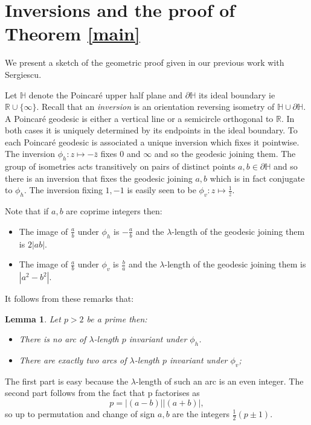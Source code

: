 \documentclass[12pt,a4paper]{amsart}
\newtheorem{lem}[thm]{Lemma}
\def\rh{\phi_h}
\def\rv{\phi_v}
\def\dHH{\partial \mathbb{H}}
\begin{document}
\section{Inversions and the proof of Theorem
\ref{main}}\label{inversions}

We present a sketch of the geometric proof given in our previous
work  with Sergiescu\cite{vlad}.

Let $\mathbb{H}$ denote the Poincaré upper half plane and $\dHH$
its ideal boundary ie $\mathbb{R}\cup \{\infty\}$.
Recall that an \textit{inversion} is an orientation reversing
isometry of $\mathbb{H}\cup \dHH$. 
A Poincaré geodesic is either a vertical line or a semicircle
orthogonal to $\mathbb{R}$.
In both cases it is uniquely determined by its endpoints in the
ideal boundary.
To each Poincaré geodesic is associated a unique inversion which fixes it pointwise. 
The inversion
$\rh: z\mapsto -\bar{z}$ fixes $0$ and $\infty$ 
and so the geodesic joining them.
The group of isometries acts transitively on pairs of distinct
points $a,b \in \partial \mathbb{H}$ and so
there is an inversion that fixes the geodesic joining $a,b$ which is
in fact conjugate to $\rh$.
The inversion fixing $1,-1$ is easily seen to be
$\rv:z\mapsto \frac{1}{\bar{z}}$. 

Note that if $a,b$ are coprime integers then:
\begin{itemize}
	\item
The image of $\frac{a}{b}$ under $\rh$ is $-\frac{a}{b}$
and the $\lambda$-length of the geodesic joining them is $2|ab|$.

	\item
The image of $\frac{a}{b}$ under $\rv$ is $\frac{b}{a}$
and the $\lambda$-length of the geodesic joining them 
is $|a^2 - b^2|$.

\end{itemize}
It follows from these remarks that:
\begin{lem}\label{counting fixed points}
	Let $p>2$ be a prime then:
	
\begin{itemize} 

	\item There is no arc of $\lambda$-length $p$
		invariant under $\rh$.
	\item There are exactly two arcs of $\lambda$-length
		$p$ invariant under $\rv$;

\end{itemize}
\end{lem}
\proof 
The first part is easy because the $\lambda$-length of such an arc
is an even integer.
The second part follows from the fact that p factorises as
$$p = |(a-b)| |(a+b)|,$$
so up to permutation and change of sign $a,b$ are the integers
$\frac{1}{2}(p\pm1)$.
\end{document}
